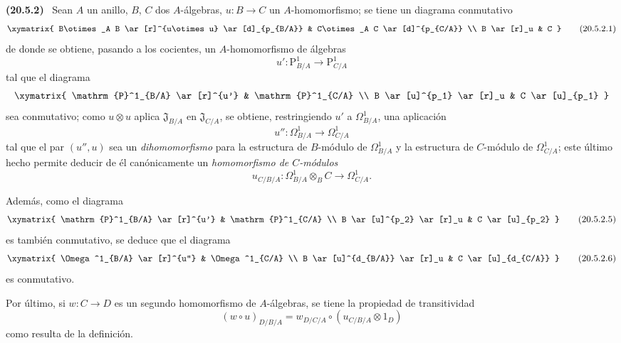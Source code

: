 \documentclass[10pt,oneside]{book}
\makeatletter
\newcommand{\setmanualcurrentlabel}[1]{\def\@currentlabel{#1}}
\newcommand{\oldpage}[2][]{%
  \setcounter{footnote}{0}%
  \marginpar{\scriptsize\textbf{#1}~|~#2}\ignorespaces}
\newenvironment{env}[1][]{\setmanualcurrentlabel{#1}\par\medskip\noindent\textbf{(#1)}\ }{\par}
\makeatother
\begin{document}
\begin{env}[20.5.2]
\label{0.20.5.2-es}
Sean $A$ un anillo, $B$, $C$ dos $A$-álgebras, $u:B\to C$ un
$A$-homomorfismo; se tiene un diagrama conmutativo
\[
\xymatrix{
  B\otimes_A B \ar[r]^{u\otimes u} \ar[d]_{p_{B/A}} &
  C\otimes_A C \ar[d]^{p_{C/A}} \\
  B \ar[r]_u & C
}
\tag{20.5.2.1}
\label{0.20.5.2.1-es}
\]
de donde se obtiene, pasando a los cocientes, un $A$-homomorfismo de álgebras
\begin{equation}
\tag{20.5.2.2}
\label{0.20.5.2.2-es}
  u':\mathrm{P}^1_{B/A}\to\mathrm{P}^1_{C/A}
\end{equation}
tal que el diagrama
\[
\xymatrix{
  \mathrm{P}^1_{B/A} \ar[r]^{u'} & \mathrm{P}^1_{C/A} \\
  B \ar[u]^{p_1} \ar[r]_u & C \ar[u]_{p_1}
}
\]
sea conmutativo; como $u\otimes u$ aplica $\mathfrak{J}_{B/A}$ en
$\mathfrak{J}_{C/A}$, se obtiene, restringiendo $u'$ a
$\Omega^1_{B/A}$, una aplicación
\begin{equation}
\tag{20.5.2.3}
\label{0.20.5.2.3-es}
  u'':\Omega^1_{B/A}\to\Omega^1_{C/A}
\end{equation}
tal que el par $(u'',u)$ sea un \emph{dihomomorfismo} para la
estructura de $B$-módulo de $\Omega^1_{B/A}$ y la estructura de $C$-módulo de
$\Omega^1_{C/A}$; este último hecho permite deducir de él canónicamente un
\emph{homomorfismo de $C$-módulos}
\begin{equation}
\tag{20.5.2.4}
\label{0.20.5.2.4-es}
  u_{C/B/A}:\Omega^1_{B/A}\otimes_B C\to\Omega^1_{C/A}.
\end{equation}

\oldpage[0\textsubscript{IV-1}]{129}
Además, como el diagrama
\[
\xymatrix{
  \mathrm{P}^1_{B/A} \ar[r]^{u'} & \mathrm{P}^1_{C/A} \\
  B \ar[u]^{p_2} \ar[r]_u & C \ar[u]_{p_2}
}
\tag{20.5.2.5}
\label{0.20.5.2.5-es}
\]
es también conmutativo, se deduce que el diagrama
\[
\xymatrix{
  \Omega^1_{B/A} \ar[r]^{u''} & \Omega^1_{C/A} \\
  B \ar[u]^{d_{B/A}} \ar[r]_u & C \ar[u]_{d_{C/A}}
}
\tag{20.5.2.6}
\label{0.20.5.2.6-es}
\]
es conmutativo.

Por último, si $w:C\to D$ es un segundo homomorfismo de $A$-álgebras, se tiene la
propiedad de transitividad
\begin{equation}
\tag{20.5.2.7}
\label{0.20.5.2.7-es}
  (w\circ u)_{D/B/A}
  =w_{D/C/A}\circ(u_{C/B/A}\otimes1_D)
\end{equation}
como resulta de la definición.
\end{env}
\end{document}
